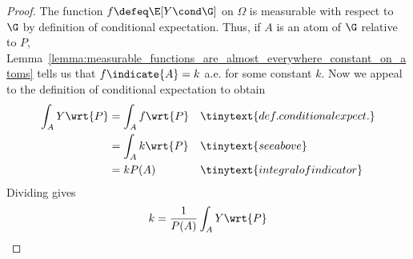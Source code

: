 \documentclass{article} %
\begin{document}
\begin{proof}
The function $f \defeq \E[Y \cond \G]$ on $\Omega$ is measurable with respect to $\G$ by definition of conditional expectation.  Thus, if $A$ is an atom of $\G$ relative to $P$, Lemma~\ref{lemma:measurable_functions_are_almost_everywhere_constant_on_atoms} tells us that $f \indicate{A} = k$ a.e. for some constant $k$.  Now we appeal to the definition of conditional expectation to obtain
%
\begin{align*}
\int_A Y \wrt{P} &= \int_A f \wrt{P}	&& \tinytext{def. conditional expect.} \\
&= \int_A k \wrt{P} && \tinytext{see above} \\
&= k P(A) && \tinytext{integral of indicator}
\end{align*}
Dividing gives
\[ k=\frac{1}{P(A)} \int_A Y \wrt{P}\]
\end{proof}
\end{document}
